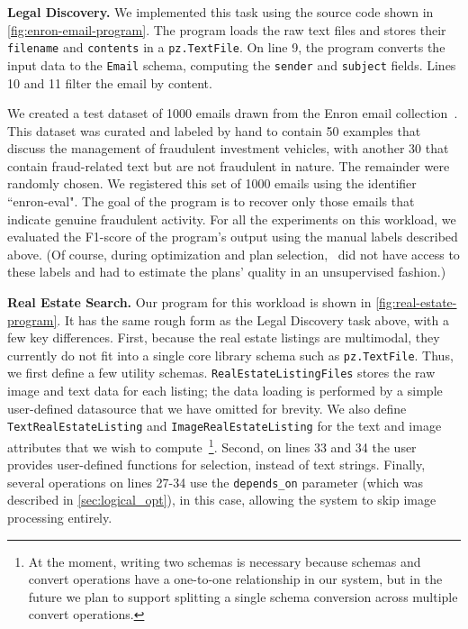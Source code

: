 {\bf Legal Discovery.} We implemented this task using the source code shown in \autoref{fig:enron-email-program}.  The program loads the raw text files and stores their {\tt filename} and {\tt contents} in a {\tt pz.TextFile}. On line 9, the program converts the input data to the {\tt Email} schema, computing the {\tt sender} and {\tt subject} fields. Lines 10 and 11 filter the email by content. 

We created a test dataset of 1000 emails drawn from the Enron email collection~\cite{enron}. This dataset was curated and labeled by hand to contain 50 examples that discuss the management of fraudulent investment vehicles, with another 30 that contain fraud-related text but are not fraudulent in nature. The remainder were randomly chosen.  We registered this set of 1000 emails using the identifier ``enron-eval". The goal of the program is to recover only those emails that indicate genuine fraudulent activity.  For all the experiments on this workload, we evaluated the F1-score of the program's output using the manual labels described above. (Of course, during optimization and plan selection, \system\ did not have access to these labels and had to estimate the plans' quality in an unsupervised fashion.)


{\bf Real Estate Search.}  Our \system{} program for this workload is shown in \autoref{fig:real-estate-program}. It has the same rough form as the Legal Discovery task above, with a few key differences.  First, because the real estate listings are multimodal, they currently do not fit into a single core library schema such as {\tt pz.TextFile}. Thus, we first define a few utility schemas. {\tt RealEstateListingFiles} stores the raw image and text data for each listing; the data loading is performed by a simple user-defined datasource that we have omitted for brevity. We also define {\tt TextRealEstateListing} and {\tt ImageRealEstateListing} for the text and image attributes that we wish to compute~\footnote{At the moment, writing two schemas is necessary because schemas and convert operations have a one-to-one relationship in our system, but in the future we plan to support splitting a single schema conversion across multiple convert operations.}.  Second, on lines 33 and 34 the user provides user-defined functions for selection, instead of text strings.  Finally, several operations on lines 27-34 use the {\tt depends\_on} parameter (which was described in \autoref{sec:logical_opt}), in this case, allowing the system to skip image processing entirely.

